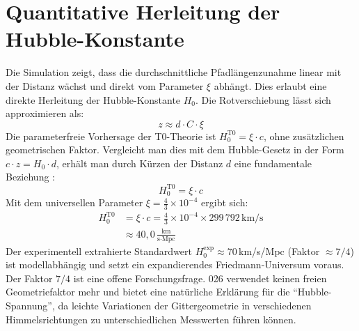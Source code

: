 \documentclass[12pt,a4paper]{article}
\begin{document}
	\section{Quantitative Herleitung der Hubble-Konstante}
	Die Simulation zeigt, dass die durchschnittliche Pfadlängenzunahme linear mit der Distanz wächst und direkt vom Parameter $\xi$ abhängt. Dies erlaubt eine direkte Herleitung der Hubble-Konstante $H_0$.
	Die Rotverschiebung lässt sich approximieren als:
	\begin{equation}
		z \approx d \cdot C \cdot \xi
	\end{equation}
	Die parameterfreie Vorhersage der T0-Theorie ist $H_0^{\text{T0}} = \xi \cdot c$, ohne zusätzlichen geometrischen Faktor.
	Vergleicht man dies mit dem Hubble-Gesetz in der Form $c \cdot z = H_0 \cdot d$, erhält man durch Kürzen der Distanz $d$ eine fundamentale Beziehung \cite{pascher:geometric_formalism}:
	\begin{equation}
		H_0^{\text{T0}} = \xi \cdot c
	\end{equation}
	Mit dem universellen Parameter $\xi = \frac{4}{3} \times 10^{-4}$ ergibt sich:
	\begin{align*}
		H_0^{\text{T0}} &= \xi \cdot c = \frac{4}{3} \times 10^{-4} \times 299\,792\,\text{km/s} \\
		&\approx 40{,}0 \, \frac{\text{km}}{\text{s} \cdot \text{Mpc}}
	\end{align*}
	Der experimentell extrahierte Standardwert $H_0^{\text{exp}} \approx 70\,$km/s/Mpc (Faktor $\approx 7/4$) ist modellabhängig und setzt ein expandierendes Friedmann-Universum voraus. Der Faktor $7/4$ ist eine offene Forschungsfrage. 026 verwendet keinen freien Geometriefaktor mehr \cite{riess2019} und bietet eine natürliche Erklärung für die ``Hubble-Spannung'', da leichte Variationen der Gittergeometrie in verschiedenen Himmelsrichtungen zu unterschiedlichen Messwerten führen können.
\end{document}
